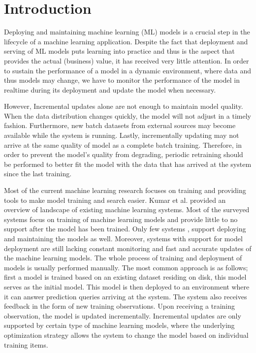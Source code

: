 \documentclass{vldb}
\begin{document}
\section{Introduction} \label{introduction}
Deploying and maintaining machine learning (ML) models is a crucial step in the lifecycle of a machine learning application. 
Despite the fact that deployment and serving of ML models puts learning into practice and thus is the aspect that provides the actual (business) value, it has received very little attention.
In order to sustain the performance of a model in a dynamic environment, where data and thus models may change, we have to monitor the performance of the model in realtime during its deployment and update the model when necessary.

However, Incremental updates alone are not enough to maintain model quality. 
When the data distribution changes quickly, the model will not adjust in a timely fashion. 
Furthermore, new batch datasets from external sources may become available while the system is running.
Lastly, incrementally updating may not arrive at the same quality of model as a complete batch training.
Therefore, in order to prevent the model's quality from degrading, periodic retraining should be performed to better fit the model with the data that has arrived at the system since the last training.

Most of the current machine learning research focuses on training and providing tools to make model training and search easier. 
Kumar et al. \cite{kumar2015survey} provided an overview of landscape of existing machine learning systems. 
Most of the surveyed systems focus on training of machine learning models and provide little to no support after the model has been trained.
Only few systems \cite{akdere2011case, crankshaw2014missing}, support deploying and maintaining the models as well.
Moreover, systems with support for model deployment are still lacking constant monitoring and fast and accurate updates of the machine learning models.
The whole process of training and deployment of models is usually performed manually.
The most common approach is as follows; first a model is trained based on an existing dataset residing on disk, this model serves as the initial model.
This model is then deployed to an environment where it can answer prediction queries arriving at the system.
The system also receives feedback in the form of new training observations.
Upon receiving a training observation, the model is updated incrementally.
Incremental updates are only supported by certain type of machine learning models, where the underlying optimization strategy allows the system to change the model based on individual training items.
\end{document}
